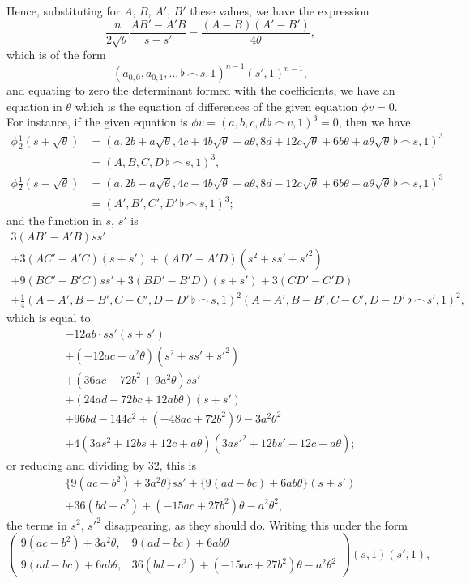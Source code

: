 \documentclass[11pt,a4paper]{article}
\theoremstyle{definition}
\begin{document}
Hence, substituting for $A$, $B$, $A'$, $B'$ these values, we have the expression
\[
\frac{n}{2\sqrt{\theta}}\frac{AB'-A'B}{s-s'}-\frac{(A-B)(A'-B')}{4\theta},
\]
which is of the form
\[
(a_{0,0},a_{0,1},\ldots\,\flat\,\frown\, s,1)^{n-1}(s',1)^{n-1},
\]
and equating to zero the determinant formed with the coefficients, we have an equation in $\theta$ which is the equation of differences of the given equation $\phi v=0$. For instance, if the given equation is $\phi v=(a,b,c,d\,\flat\,\frown\, v,1)^3=0$, then we have
\begin{align*}
\phi\tfrac{1}{2}(s+\sqrt{\theta}) &= (a,2b+a\sqrt{\theta},4c+4b\sqrt{\theta}+a\theta,8d+12c\sqrt{\theta}+6b\theta+a\theta\sqrt{\theta}\,\flat\,\frown\, s,1)^3\\
&=(A,B,C,D\,\flat\,\frown\, s,1)^3,\\
\phi\tfrac{1}{2}(s-\sqrt{\theta}) &= (a,2b-a\sqrt{\theta},4c-4b\sqrt{\theta}+a\theta,8d-12c\sqrt{\theta}+6b\theta-a\theta\sqrt{\theta}\,\flat\,\frown\, s,1)^3\\
&=(A',B',C',D'\,\flat\,\frown\, s,1)^3;
\end{align*}
and the function in $s$, $s'$ is
\begin{multline*}
3(AB'-A'B)ss'\\
+3(AC'-A'C)(s+s')+(AD'-A'D)(s^2+ss'+s'^2)\\
+9(BC'-B'C)ss'+3(BD'-B'D)(s+s')+3(CD'-C'D)\\
+\tfrac{1}{4}(A-A',B-B',C-C',D-D'\,\flat\,\frown\, s,1)^2(A-A',B-B',C-C',D-D'\,\flat\,\frown\, s',1)^2,
\end{multline*}
which is equal to
\begin{multline*}
-12ab\cdot ss'(s+s')\\
+(-12ac-a^2\theta)(s^2+ss'+s'^2)\\
+(36ac-72b^2+9a^2\theta)ss'\\
+(24ad-72bc+12ab\theta)(s+s')\\
+96bd-144c^2+(-48ac+72b^2)\theta-3a^2\theta^2\\
+4(3as^2+12bs+12c+a\theta)(3as'^2+12bs'+12c+a\theta);
\end{multline*}
or reducing and dividing by 32, this is
\begin{multline*}
\{9(ac-b^2)+3a^2\theta\}ss'+\{9(ad-bc)+6ab\theta\}(s+s')\\
+36(bd-c^2)+(-15ac+27b^2)\theta-a^2\theta^2,
\end{multline*}
the terms in $s^2$, $s'^2$ disappearing, as they should do. Writing this under the form
\[
\begin{pmatrix}
9(ac-b^2)+3a^2\theta, & 9(ad-bc)+6ab\theta \\
9(ad-bc)+6ab\theta, & 36(bd-c^2)+(-15ac+27b^2)\theta-a^2\theta^2
\end{pmatrix}(s,1)(s',1),
\]
\end{document}
